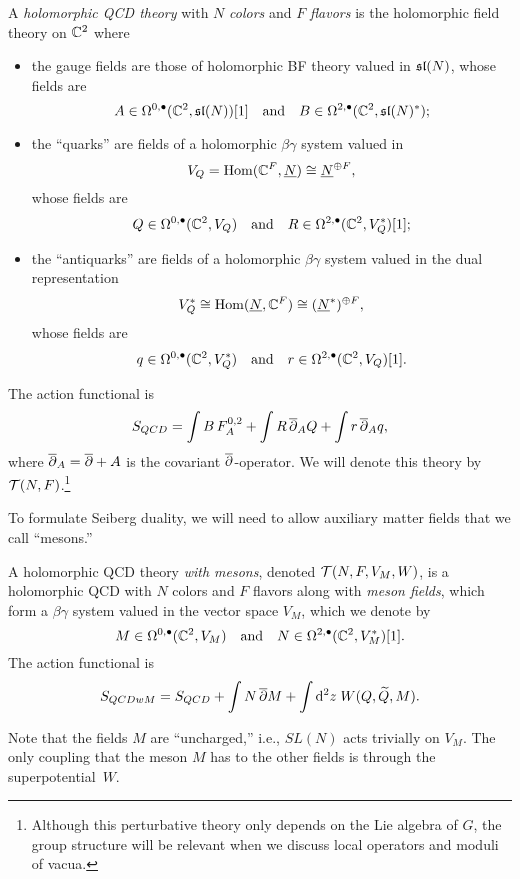 \documentclass[11pt]{amsart}
\begin{document}
\begin{dfn}
A {\em holomorphic QCD theory} with $N$ {\em colors} and $F$ {\em flavors} is the holomorphic field theory on $\CC^2$ where
\begin{itemize}
\item the gauge fields are those of holomorphic BF theory valued in $\sl(N)$, whose fields are
\[
A \in \Omega^{0,\bu}(\CC^2 , \sl(N))[1] \quad\text{and}\quad B \in \Omega^{2,\bu}(\CC^2, \sl(N)^*);
\]
\item the ``quarks'' are fields of a holomorphic $\beta\gamma$ system valued in 
\[
V_Q = \Hom(\CC^F, \underline{N}) \cong \underline{N}^{\oplus F},
\] 
whose fields are
\[
Q \in \Omega^{0,\bu}(\CC^2 , V_Q) \quad\text{and}\quad R \in \Omega^{2,\bu}(\CC^2 , V_Q^*)[1];
\]
\item the ``antiquarks'' are fields of a holomorphic $\beta\gamma$ system valued in the dual representation 
\[
V^*_Q \cong \Hom(\underline{N}, \CC^F) \cong (\underline{N}^*)^{\oplus F}, 
\]
whose fields are
\[
q \in \Omega^{0,\bu}(\CC^2 , V^*_Q) \quad\text{and}\quad r \in \Omega^{2,\bu}(\CC^2 , V_Q) [1].
\]
\end{itemize}

The action functional is
\[
S_{QCD} = \int B\, F^{0,2}_A + \int R \,\dbar_A Q + \int r \,\dbar_A q,
\]
where $\dbar_A = \dbar + A$ is the covariant $\dbar$-operator. 
We will denote this theory by $\cT(N,F)$.\footnote{Although this perturbative theory only depends on the Lie algebra of $G$, the group structure will be relevant when we discuss local operators and moduli of vacua.} 
\end{dfn}

To formulate Seiberg duality, we will need to allow auxiliary matter fields that we call ``mesons.''

\begin{dfn}
A holomorphic QCD theory {\em with mesons}, denoted $\cT(N,F, V_M, W)$, is a holomorphic QCD with $N$ colors and $F$ flavors along with {\em meson fields}, which form a $\beta\gamma$ system valued in the vector space $V_M$, which we denote by
\[
M \in \Omega^{0,\bu}(\CC^2 , V_M) \quad\text{and}\quad N \in \Omega^{2,\bu}(\CC^2 , V_M^*) [1] .
\]
The action functional is
\[
S_{QCDwM} = S_{QCD} + \int N \,\dbar M + \int \d^2 z \; W(Q, \Tilde{Q}, M) .
\] 
\end{dfn}

Note that the fields $M$ are ``uncharged,'' i.e., $SL(N)$ acts trivially on $V_M$.
The only coupling that the meson $M$ has to the other fields is through the superpotential~$W$. 
\end{document}
